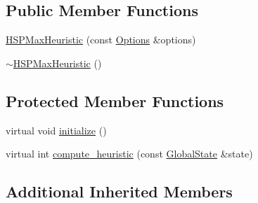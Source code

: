 \subsection*{Public Member Functions}
\begin{DoxyCompactItemize}
\item 
\hyperlink{classHSPMaxHeuristic_a7d7fe230e50a8df2fa6436ad4aa4ac23}{H\-S\-P\-Max\-Heuristic} (const \hyperlink{classOptions}{Options} \&options)
\item 
\hyperlink{classHSPMaxHeuristic_ae688e1368c0ee8078be6c42121ae853f}{$\sim$\-H\-S\-P\-Max\-Heuristic} ()
\end{DoxyCompactItemize}
\subsection*{Protected Member Functions}
\begin{DoxyCompactItemize}
\item 
virtual void \hyperlink{classHSPMaxHeuristic_a95b1b3153abac96278a4b15093fe9c79}{initialize} ()
\item 
virtual int \hyperlink{classHSPMaxHeuristic_ac97158b2b7d25b8ec895ebc1c0bf2930}{compute\-\_\-heuristic} (const \hyperlink{classGlobalState}{Global\-State} \&state)
\end{DoxyCompactItemize}
\subsection*{Additional Inherited Members}


